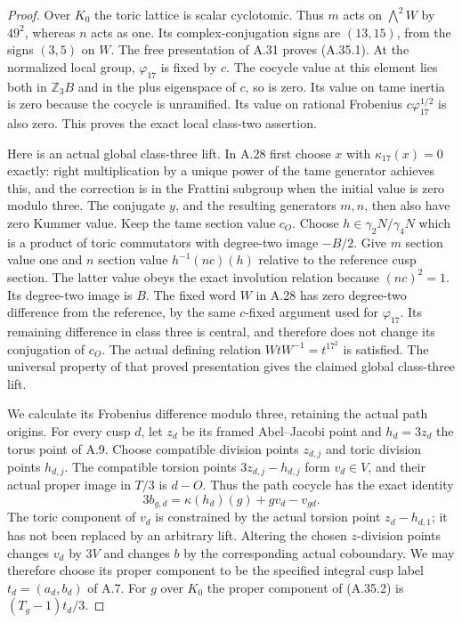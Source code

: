 \begin{proof}
Over $K_0$ the toric lattice is scalar cyclotomic. Thus
$m$ acts on $\bigwedge^2W$ by $49^2$, whereas $n$ acts
as one. Its complex-conjugation signs are $(13,15)$,
from the signs $(3,5)$ on $W$. The free presentation of
A.31 proves (A.35.1). At the normalized local group,
$\varphi_{17}$ is fixed by $c$. The cocycle value at this
element lies both in $\mathbb Z_3B$ and in the plus
eigenspace of $c$, so is zero. Its value on tame inertia
is zero because the cocycle is unramified. Its value on
rational Frobenius $c\varphi_{17}^{1/2}$ is also zero.
This proves the exact local class-two assertion.

Here is an actual global class-three lift. In A.28 first
choose $x$ with $\kappa_{17}(x)=0$ exactly: right
multiplication by a unique power of the tame generator
achieves this, and the correction is in the Frattini
subgroup when the initial value is zero modulo three.
The conjugate $y$, and the resulting generators $m,n$,
then also have zero Kummer value. Keep the tame section
value $c_O$. Choose $h\in\gamma_2N/\gamma_4N$ which is
a product of toric commutators with degree-two image
$-B/2$. Give $m$ section value one and $n$ section value
$h^{-1}(nc)(h)$ relative to the reference cusp section.
The latter value obeys the exact involution relation
because $(nc)^2=1$. Its degree-two image is $B$.
The fixed word $W$ in A.28 has zero degree-two difference
from the reference, by the same $c$-fixed argument used
for $\varphi_{17}$. Its remaining difference in class
three is central, and therefore does not change its
conjugation of $c_O$. The actual defining relation
$WtW^{-1}=t^{17^2}$ is satisfied. The universal property
of that proved presentation gives the claimed global
class-three lift.

We calculate its Frobenius difference modulo three,
retaining the actual path origins. For every cusp $d$,
let $z_d$ be its framed Abel--Jacobi point and $h_d=3z_d$
the torus point of A.9. Choose compatible division
points $z_{d,j}$ and toric division points $h_{d,j}$.
The compatible torsion points
$3z_{d,j}-h_{d,j}$ form $v_d\in V$, and their actual
proper image in $T/3$ is $d-O$. Thus the path cocycle
has the exact identity
\[
 3b_{g,d}=\kappa(h_d)(g)+g v_d-v_{gd}.
 \tag{A.35.2}
\]
The toric component of $v_d$ is constrained by the
actual torsion point $z_d-h_{d,1}$; it has not been
replaced by an arbitrary lift. Altering the chosen
$z$-division points changes $v_d$ by $3V$ and changes
$b$ by the corresponding actual coboundary. We may
therefore choose its proper component to be the
specified integral cusp label $t_d=(a_d,b_d)$ of A.7.
For $g$ over $K_0$ the proper component of (A.35.2) is
$(T_g-1)t_d/3$.


\end{proof}
